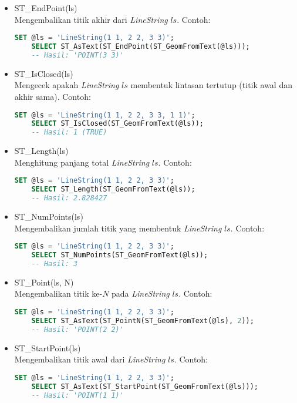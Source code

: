\begin{itemize}
    \item ST\_EndPoint(ls)
    \\ Mengembalikan titik akhir dari \textit{LineString} $ls$. Contoh:
    \begin{lstlisting}[language=SQL]
    SET @ls = 'LineString(1 1, 2 2, 3 3)';
    SELECT ST_AsText(ST_EndPoint(ST_GeomFromText(@ls))); 
    -- Hasil: 'POINT(3 3)'
    \end{lstlisting}
    
    \item ST\_IsClosed(ls)
    \\ Mengecek apakah \textit{LineString} $ls$ membentuk lintasan tertutup (titik awal dan akhir sama). Contoh: 
    \begin{lstlisting}[language=SQL]
    SET @ls = 'LineString(1 1, 2 2, 3 3, 1 1)';
    SELECT ST_IsClosed(ST_GeomFromText(@ls));
    -- Hasil: 1 (TRUE)
    \end{lstlisting}
    
    \item ST\_Length(ls)
    \\ Menghitung panjang total \textit{LineString} $ls$. Contoh: \begin{lstlisting}[language=SQL]
    SET @ls = 'LineString(1 1, 2 2, 3 3)';
    SELECT ST_Length(ST_GeomFromText(@ls));
    -- Hasil: 2.828427
    \end{lstlisting}

    \item ST\_NumPoints(ls)
    \\ Mengembalikan jumlah titik yang membentuk \textit{LineString} $ls$. Contoh: 
    \begin{lstlisting}[language=SQL]
    SET @ls = 'LineString(1 1, 2 2, 3 3)';
    SELECT ST_NumPoints(ST_GeomFromText(@ls));
    -- Hasil: 3
    \end{lstlisting}
    
    \item ST\_Point(ls, N)
    \\ Mengembalikan titik ke-$N$ pada \textit{LineString} $ls$. Contoh: \begin{lstlisting}[language=SQL]
    SET @ls = 'LineString(1 1, 2 2, 3 3)';
    SELECT ST_AsText(ST_PointN(ST_GeomFromText(@ls), 2));
    -- Hasil: 'POINT(2 2)'
    \end{lstlisting}
    
    \item ST\_StartPoint(ls)
    \\ Mengembalikan titik awal dari \textit{LineString} $ls$. Contoh: \begin{lstlisting}[language=SQL]
    SET @ls = 'LineString(1 1, 2 2, 3 3)';
    SELECT ST_AsText(ST_StartPoint(ST_GeomFromText(@ls)));
    -- Hasil: 'POINT(1 1)'
    \end{lstlisting}

\end{itemize}

